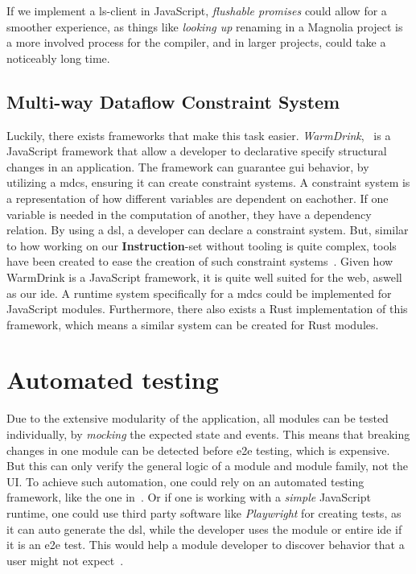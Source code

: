 If we implement a \gls*{ls}-client in JavaScript, \textit{flushable promises}
could allow for a smoother experience, as things like \textit{looking up}
renaming in a Magnolia project is a more involved process for the compiler,
and in larger projects, could take a noticeably long time.


\subsection{Multi-way Dataflow Constraint System}

Luckily, there exists frameworks that make this task easier.
\textit{WarmDrink},~\cite{warmDrink, dslMdcs} is a JavaScript framework that
allow a developer to declarative specify structural changes in an application.
The framework can guarantee \gls*{gui} behavior, by utilizing a \gls*{mdcs},
ensuring it can create constraint systems. A constraint system is a
representation of how different variables are dependent on eachother. If one
variable is needed in the computation of another, they have a dependency
relation. By using a \gls*{dsl}, a developer can declare a constraint system.
But, similar to how working on our \textbf{Instruction}-set without tooling is
quite complex, tools have been created to ease the creation of such constraint
systems~\cite{toolMcds}. Given how WarmDrink is a JavaScript framework, it is
quite well suited for the web, aswell as our \gls*{ide}. A runtime system
specifically for a \gls*{mdcs} could be implemented for JavaScript modules.
Furthermore, there also exists a Rust implementation of this framework, which
means a similar system can be created for Rust modules.


\section{Automated testing} \label{sec:auto-test}

Due to the extensive modularity of the application, all modules can be tested
individually, by \textit{mocking} the expected state and events. This means that
breaking changes in one module can be detected before \gls*{e2e} testing, which
is expensive. But this can only verify the general logic of a module and module
family, not the UI. To achieve such automation, one could rely on an automated
testing framework, like the one in~\cite{autoUi}. Or if one is working with a
\textit{simple} JavaScript runtime, one could use third party software like
\textit{Playwright} for creating tests, as it can auto generate the \gls*{dsl},
while the developer uses the module or entire \gls*{ide} if it is an \gls*{e2e}
test. This would help a module developer to discover behavior that a user might
not expect~\cite{leastGui}.


